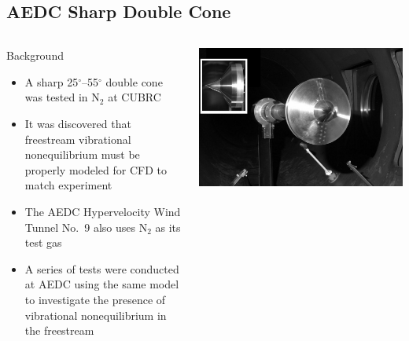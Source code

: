 \documentclass[compress,11pt]{beamer}
\begin{document}
\subsection{AEDC Sharp Double Cone}
\frame
{
  \begin{columns}[t]
    \vspace{-1em}
    \begin{block}{Background}
      \footnotesize
      \begin{itemize}
        \item A sharp 25$^\circ$--55$^\circ$ double cone was tested in N$_2$ at CUBRC
	\item It was discovered that freestream vibrational nonequilibrium must be properly modeled for CFD to match experiment~\cite{nompelis_candler_holden_double_cone}
	\item The AEDC Hypervelocity Wind Tunnel No.~9 also uses N$_2$ as its test gas
	\item A series of tests were conducted at AEDC using the same model to investigate the presence of vibrational nonequilibrium in the freestream~\cite{AEDC_HVWT9_double_cone}
      \end{itemize}
    \end{block}
    
    \vspace{2em}
    
    \includegraphics[width=\textwidth]{figures/aedc_double_cone/double_cone_HVWT9}
  \end{columns}
}
\end{document}
